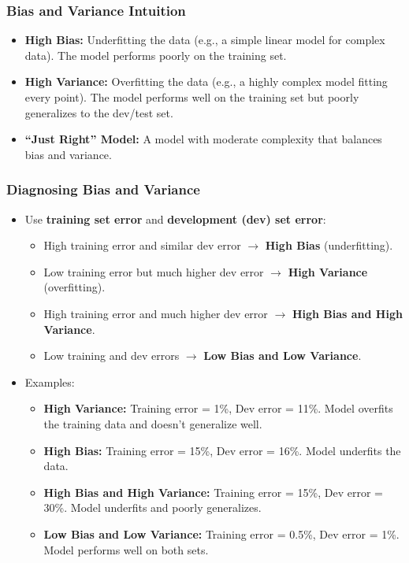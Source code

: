 \documentclass[letterpaper,12pt,notitlepage,twoside]{report}
\begin{document}
\subsubsection*{Bias and Variance Intuition}
\begin{itemize}[leftmargin=*, nosep]
    \item \textbf{High Bias:} Underfitting the data (e.g., a simple linear model for complex data). The model performs poorly on the training set.
    \item \textbf{High Variance:} Overfitting the data (e.g., a highly complex model fitting every point). The model performs well on the training set but poorly generalizes to the dev/test set.
    \item \textbf{``Just Right'' Model:} A model with moderate complexity that balances bias and variance.
\end{itemize}

\subsubsection*{Diagnosing Bias and Variance}
\begin{itemize}[leftmargin=*]
    \item Use \textbf{training set error} and \textbf{development (dev) set error}:
    \begin{itemize}
        \item High training error and similar dev error $\rightarrow$ \textbf{High Bias} (underfitting).
        \item Low training error but much higher dev error $\rightarrow$ \textbf{High Variance} (overfitting).
        \item High training error and much higher dev error $\rightarrow$ \textbf{High Bias and High Variance}.
        \item Low training and dev errors $\rightarrow$ \textbf{Low Bias and Low Variance}.
    \end{itemize}
    \item Examples:
	\begin{itemize}
	    \item \textbf{High Variance:} Training error = 1\%, Dev error = 11\%. Model overfits the training data and doesn’t generalize well.
	    \item \textbf{High Bias:} Training error = 15\%, Dev error = 16\%. Model underfits the data.
	    \item \textbf{High Bias and High Variance:} Training error = 15\%, Dev error = 30\%. Model underfits and poorly generalizes.
	    \item \textbf{Low Bias and Low Variance:} Training error = 0.5\%, Dev error = 1\%. Model performs well on both sets.
	\end{itemize}
\end{itemize}
\end{document}
